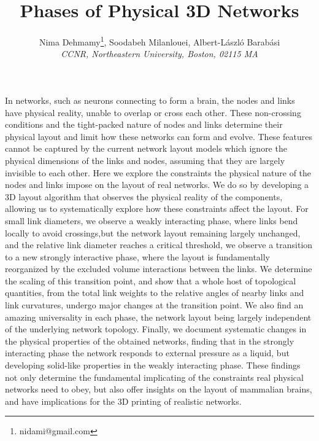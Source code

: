 \documentclass[10pt]{article}%
\begin{document}
\title{Phases of Physical 3D Networks}
\author{Nima Dehmamy\thanks{nidami@gmail.com}, Soodabeh Milanlouei, Albert-L\'aszl\'o Barab\'asi \\
{\em CCNR, Northeastern University, Boston, 02115 MA} }
\maketitle
In networks, such as neurons connecting to form a brain, the nodes and links have physical reality, unable to overlap or cross each other. 
These non-crossing conditions and the tight-packed nature of nodes and links determine their physical layout and limit how these networks can form and evolve. 
These features cannot be captured by the current network layout models which ignore the physical dimensions of the links and nodes, assuming that they are largely invisible to each other. 
Here we explore the constraints the physical nature of the nodes and links impose on the layout of real networks. 
We do so by developing a 3D layout algorithm that observes the physical reality of the components, allowing us to systematically explore how these constraints affect the layout. 
For small link diameters, we observe a weakly interacting phase, where links bend locally to avoid crossings,but the network layout remaining largely unchanged, and the relative link diameter reaches a critical threshold, we observe a transition to a new strongly interactive phase, where the layout is fundamentally reorganized by the excluded volume interactions between the links. 
We determine the scaling of this transition point, and show that a whole host of topological quantities, from the total link weights to the relative angles of nearby links and link curvatures, undergo major changes at the transition point. 
We also find an amazing universality in each phase, the network layout being largely independent of the underlying network topology. 
Finally, we document systematic changes in the physical properties of the obtained networks, finding that in the strongly interacting phase the network responds to external pressure as a liquid, but developing solid-like properties in the weakly interacting phase. 
These findings not only determine the fundamental implicating of the constraints real physical networks need to obey, but also offer insights on the layout of mammalian brains, and have implications for the 3D printing of realistic networks.
\end{document}
